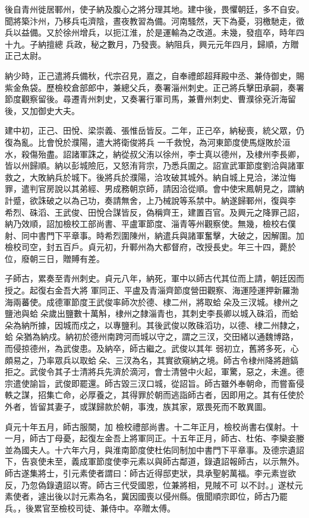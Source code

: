 \begin{pinyinscope}
 後自青州徙居鄆州，使子納及腹心之將分理其地。建中後，畏懼朝廷，多不自安。聞將築汴州，乃移兵屯濟陰，晝夜教習為備。河南騷然，天下為憂，羽檄馳走，徵兵以益備。又於徐州增兵，以扼江淮，於是運輸為之改道。未幾，發疽卒，時年四十九。子納擅總
 兵政，秘之數月，乃發喪。納阻兵，興元元年四月，歸順，方贈正己太尉。



 納少時，正己遣將兵備秋，代宗召見，嘉之，自奉禮郎超拜殿中丞、兼侍御史，賜紫金魚袋。歷檢校倉部郎中，兼總父兵，奏署淄州刺史。正己將兵擊田承嗣，奏署節度觀察留後。尋遷青州刺史，又奏署行軍司馬，兼曹州刺史、曹濮徐兗沂海留後，又加御史大夫。



 建中初，正己、田悅、梁崇義、張惟岳皆反。二年，正己卒，納秘喪，統父眾，仍復為亂。比會悅於濮陽，遣大將衛俊將兵
 一千救悅，為河東節度使馬燧敗於洹水，殺傷殆盡。詔諸軍誅之，納從叔父洧以徐州，李士真以德州，及棣州李長卿，皆以州歸順。納以彭城險厄，又怒洧背宗，乃悉兵圍之。詔宣武軍節度劉洽與諸軍救之，大敗納兵於城下。後將兵於濮陽，洽攻破其城外。納自城上見洽，涕泣悔罪，遣判官房說以其弟經、男成務朝京師，請因洽從順。會中使宋鳳朝見之，謂納計蹙，欲誅破之以為己功，奏請無舍，上乃械說等系禁中。納遂歸鄆州，復與李
 希烈、硃滔、王武俊、田悅合謀皆反，偽稱齊王，建置百官。及興元之降罪己詔，納乃效順，詔加檢校工部尚書、平盧軍節度、淄青等州觀察使。無幾，檢校右僕射、同中書門下平章事。時希烈圍陳州，納遣兵與諸軍奮擊，大破之，因解圍。加檢校司空，封五百戶。貞元初，升鄆州為大都督府，改授長史。年三十四，薨於位，廢朝三日，贈賻有差。



 子師古，累奏至青州刺史。貞元八年，納死，軍中以師古代其位而上請，朝廷因而授之。起復右金吾大將
 軍同正、平盧及青淄齊節度營田觀察、海運陸運押新羅渤海兩蕃使。成德軍節度王武俊率師次於德、棣二州，將取蛤朵及三汊城。棣州之鹽池與蛤朵歲出鹽數十萬斛，棣州之隸淄青也，其刺史李長卿以城入硃滔，而蛤朵為納所據，因城而戍之，以專鹽利。其後武俊以敗硃滔功，以德、棣二州隸之，蛤朵猶為納戍。納初於德州南跨河而城以守之，謂之三汊，交田緒以通魏博路，而侵掠德州，為武俊患。及納卒，師古繼之。武俊以其年
 弱初立，舊將多死，心頗易之，乃率眾兵以取蛤朵、三汊為名，其實欲窺納之境。師古令棣州降將趙鎬拒之。武俊令其子士清將兵先濟於滴河，會士清營中火起，軍驚，惡之，未進。德宗遣使諭旨，武俊即罷還。師古毀三汊口城，從詔旨。師古雖外奉朝命，而嘗畜侵軼之謀，招集亡命，必厚養之，其得罪於朝而逃詣師古者，因即用之。其有任使於外者，皆留其妻子，或謀歸款於朝，事洩，族其家，眾畏死而不敢異圖。



 貞元十年五月，師古服闋，加
 檢校禮部尚書。十二年正月，檢校尚書右僕射。十一月，師古丁母憂，起復左金吾上將軍同正。十五年正月，師古、杜佑、李欒妾媵並為國夫人。十六年六月，與淮南節度使杜佑同制加中書門下平章事。及德宗遺詔下，告哀使未至，義成軍節度使李元素以與師古鄰道，錄遺詔報師古，以示無外。師古遂集將士，引元素使者謂曰：師古近得邸吏狀，具承聖躬萬福。李元素豈欲反，乃忽偽錄遺詔以寄。師古三代受國恩，位兼將相，見賊不可
 以不討。」遂杖元素使者，遽出後以討元素為名，冀因國喪以侵州縣。俄聞順宗即位，師古乃罷兵。，後累官至檢校司徒、兼侍中。卒贈太傅。




\end{pinyinscope}
